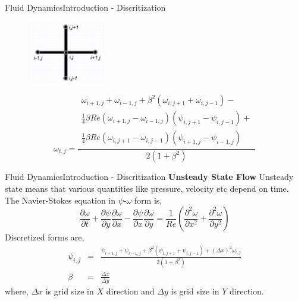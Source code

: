 \documentclass[11pt]{beamer}
\begin{document}
\begin{frame}{Fluid Dynamics}{Introduction - Discritization}
\begin{figure}[hH]
\includegraphics[width=0.3\textwidth]{images/2}
\end{figure}
\begin{equation} \label{somega}
\omega_{i,j} = \frac{ \begin{split} \omega_{i+1,j} + \omega_{i-1,j} + \beta ^{2}(\omega_{i,j+1} + \omega_{i,j-1}) -\\ \frac{1}{4}\beta Re(\omega_{i+1,j} - \omega_{i-1,j})(\psi_{i,j+1} - \psi_{i,j-1}) +\\
\frac{1}{4}\beta Re(\omega_{i,j+1} -   \omega_{i,j-1})(\psi_{i+1,j} - \psi_{i-1,j})\end{split}}{2(1+\beta^{2})}
\end{equation}
\end{frame}

\begin{frame}{Fluid Dynamics}{Introduction - Discritization}
\textbf{Unsteady State Flow}
\linebreak
Unsteady state means that various quantities like pressure, velocity etc depend on time. The Navier-Stokes equation in $\psi$-$\omega$ form is,
\begin{equation} \label{eqn222}
\frac{\partial \omega}{\partial t} + \frac{\partial \psi}{\partial y}\frac{\partial \omega}{\partial x} - \frac{\partial \psi}{\partial x}\frac{\partial \omega}{\partial y} = \frac{1}{Re}\left( \frac{\partial ^{2}\omega}{\partial x^{2}} + \frac{\partial ^{2}\omega}{\partial y^{2}} \right)
\end{equation}
Discretized forms are, 
\begin{eqnarray} \label{upsi}
\psi_{i,j} &=& \frac{\psi_{i+1,j} + \psi_{i-1,j} + \beta^{2}(\psi_{i,j+1} + \psi_{i,j-1}) + (\Delta x)^{2}\omega_{i,j}}{2(1+\beta^{2})} \\
\beta &=& \frac{\Delta x }{\Delta y} \nonumber
\end{eqnarray}
where, $\Delta x$ is grid size in $X$ direction and $\Delta y$ is grid size in $Y$ direction.
\end{frame}
\end{document}
